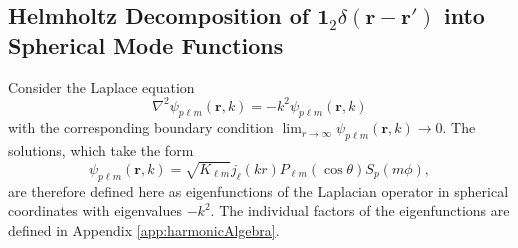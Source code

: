 \subsection{Helmholtz Decomposition of $\bm{1}_2\delta(\mathbf{r} - \mathbf{r}')$ into Spherical Mode Functions}\label{app:helmholtzDelta}

Consider the Laplace equation
\begin{equation}
\nabla^2\psi_{p\ell m}(\mathbf{r},k) = -k^2\psi_{p\ell m}(\mathbf{r},k)
\end{equation}
with the corresponding boundary condition $\lim_{r\to\infty}\psi_{p\ell m}(\mathbf{r},k)\to0$. The solutions, which take the form
\begin{equation}
\psi_{p\ell m}(\mathbf{r},k) = \sqrt{K_{\ell m}}j_\ell(kr)P_{\ell m}(\cos\theta)S_p(m\phi),
\end{equation}
are therefore defined here as eigenfunctions of the Laplacian operator in spherical coordinates with eigenvalues $-k^2$. The individual factors of the eigenfunctions are defined in Appendix \ref{app:harmonicAlgebra}. 


